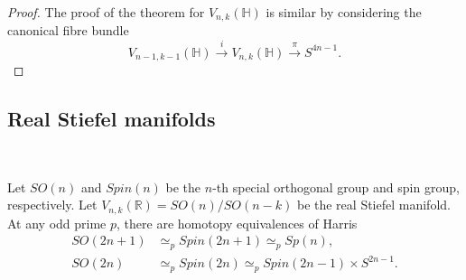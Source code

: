 \documentclass[a4]{amsart}
\theoremstyle{definition}
\begin{document}
\begin{sloppypar}
\begin{proof}
The proof of the theorem for $V_{n,k}(\mathbb{H})$ is similar by considering the canonical fibre bundle 
\[
V_{n-1,k-1}(\mathbb{H})\stackrel{i}{\longrightarrow}V_{n,k}(\mathbb{H}) \stackrel{\pi}{\longrightarrow} S^{4n-1}.
\]
\end{proof}



\subsection{Real Stiefel manifolds}
\label{subsec: stiefel2}

$\, $


Let $SO(n)$ and $Spin(n)$ be the $n$-th special orthogonal group and spin group, respectively. Let $V_{n,k}(\mathbb{R})=SO(n)/SO(n-k)$ be the real Stiefel manifold. At any odd prime $p$, there are homotopy equivalences of Harris \cite{Har61}
\[
\begin{split}
SO(2n+1)&\simeq_{p} Spin(2n+1)\simeq_{p} Sp(n), \\
SO(2n)&\simeq_{p} Spin(2n)\simeq_{p} Spin(2n-1)\times S^{2n-1}.
\end{split}
\]


\end{sloppypar}
\end{document}
